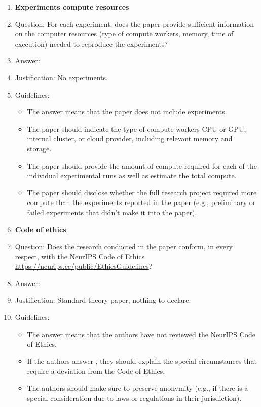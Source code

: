 \documentclass{article}
\numberwithin{theorem}{section}
\theoremstyle{definition}
\begin{document}
\begin{enumerate}
\item {\bf Experiments compute resources}
    \item[] Question: For each experiment, does the paper provide sufficient information on the computer resources (type of compute workers, memory, time of execution) needed to reproduce the experiments?
    \item[] Answer: \answerNA{} %
    \item[] Justification: No experiments.
    \item[] Guidelines:
    \begin{itemize}
        \item The answer \answerNA{} means that the paper does not include experiments.
        \item The paper should indicate the type of compute workers CPU or GPU, internal cluster, or cloud provider, including relevant memory and storage.
        \item The paper should provide the amount of compute required for each of the individual experimental runs as well as estimate the total compute. 
        \item The paper should disclose whether the full research project required more compute than the experiments reported in the paper (e.g., preliminary or failed experiments that didn't make it into the paper). 
    \end{itemize}
    
\item {\bf Code of ethics}
    \item[] Question: Does the research conducted in the paper conform, in every respect, with the NeurIPS Code of Ethics \url{https://neurips.cc/public/EthicsGuidelines}?
    \item[] Answer: \answerYes{} %
    \item[] Justification: Standard theory paper, nothing to declare.
    \item[] Guidelines:
    \begin{itemize}
        \item The answer \answerNA{} means that the authors have not reviewed the NeurIPS Code of Ethics.
        \item If the authors answer \answerNo, they should explain the special circumstances that require a deviation from the Code of Ethics.
        \item The authors should make sure to preserve anonymity (e.g., if there is a special consideration due to laws or regulations in their jurisdiction).
    \end{itemize}



\end{enumerate}
\end{document}

